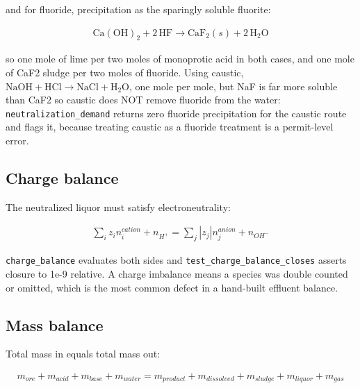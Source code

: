 \documentclass[10pt,a4paper,twoside]{report}
\begin{document}
and for fluoride, precipitation as the sparingly soluble fluorite:

\begin{equation*}
\begin{gathered}
\mathrm{Ca(OH)_2} + 2\,\mathrm{HF} \rightarrow \mathrm{CaF_2}(s) + 2\,\mathrm{H_2O}
\end{gathered}
\end{equation*}

so one mole of lime per two moles of monoprotic acid in both cases, and one mole of CaF2 sludge per two moles of fluoride. Using caustic, $\mathrm{NaOH} + \mathrm{HCl} \rightarrow \mathrm{NaCl} + \mathrm{H_2O}$, one mole per mole, but NaF is far more soluble than CaF2 so caustic does NOT remove fluoride from the water: \texttt{neutralization\_demand} returns zero fluoride precipitation for the caustic route and flags it, because treating caustic as a fluoride treatment is a permit-level error.

\subsection*{Charge balance}

The neutralized liquor must satisfy electroneutrality:

\begin{equation*}
\begin{gathered}
\sum_i z_i n_i^{cation} + n_{H^+} = \sum_j |z_j| n_j^{anion} + n_{OH^-}
\end{gathered}
\end{equation*}

\texttt{charge\_balance} evaluates both sides and \texttt{test\_charge\_balance\_closes} asserts closure to 1e-9 relative. A charge imbalance means a species was double counted or omitted, which is the most common defect in a hand-built effluent balance.

\subsection*{Mass balance}

Total mass in equals total mass out:

\begin{equation*}
\begin{gathered}
m_{ore} + m_{acid} + m_{base} + m_{water} = m_{product} + m_{dissolved} + m_{sludge} + m_{liquor} + m_{gas}
\end{gathered}
\end{equation*}
\end{document}
